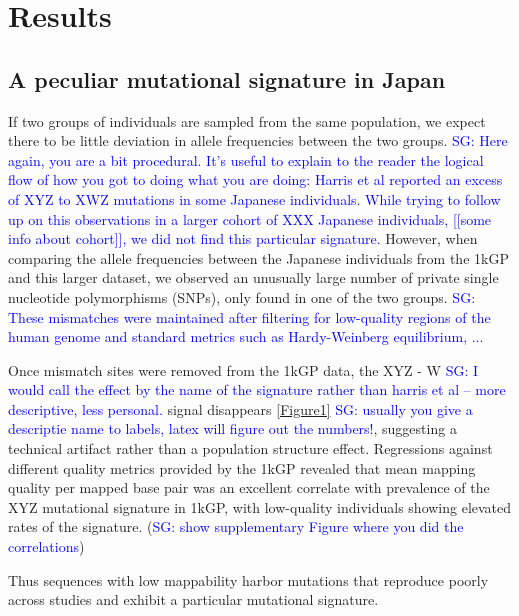 \documentclass[9pt,lineno]{elife}
\newcommand{\sgcomment}[1]{\textcolor{blue}{SG: #1}}
\begin{document}
			\section{Results}
	\subsection{A peculiar mutational signature in Japan}			
If two groups of individuals are sampled from the same population, we expect there to be little deviation in allele frequencies between the two groups. \sgcomment {Here again, you are a bit procedural. It's useful to explain to the reader the logical flow of how you got to doing what you are doing: Harris et al reported an excess of XYZ to XWZ mutations in some Japanese individuals. While trying to follow up on this observations in a larger cohort of XXX Japanese individuals, [[some info about cohort]], we did not find this particular signature.}
However, when comparing the allele frequencies between the Japanese individuals from the 1kGP and this larger dataset, we observed an unusually large number of private single nucleotide polymorphisms (SNPs), only found in one of the two groups. \sgcomment{These mismatches were maintained after filtering for low-quality regions of the human genome and standard metrics such as Hardy-Weinberg equilibrium, ...}

Once mismatch sites were removed from the 1kGP data, the XYZ - W \sgcomment{I would call the effect by the name of the signature rather than harris et al -- more descriptive, less personal.} signal disappears \ref{Figure1} \sgcomment{usually you give a descriptie name to labels, latex will figure out the numbers!}, suggesting a technical artifact rather than a population structure effect. Regressions against different quality metrics provided by the 1kGP revealed that mean mapping quality per mapped base pair was an excellent correlate with prevalence of the XYZ mutational signature in 1kGP, with low-quality individuals showing elevated rates of the signature. (\sgcomment{show supplementary Figure where you did the correlations})
 
 Thus sequences with low mappability harbor mutations that reproduce poorly across studies and exhibit a particular mutational signature. 
\end{document}
